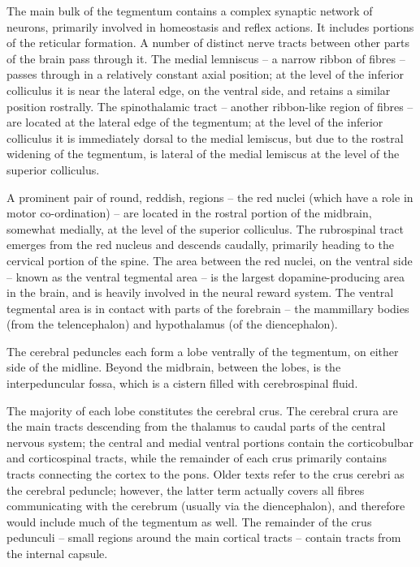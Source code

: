 The main bulk of the tegmentum contains a complex synaptic network of neurons, primarily involved in homeostasis and reflex actions. It includes portions of the reticular formation. A number of distinct nerve tracts between other parts of the brain pass through it. The medial lemniscus -- a narrow ribbon of fibres -- passes through in a relatively constant axial position; at the level of the inferior colliculus it is near the lateral edge, on the ventral side, and retains a similar position rostrally. The spinothalamic tract -- another ribbon-like region of fibres -- are located at the lateral edge of the tegmentum; at the level of the inferior colliculus it is immediately dorsal to the medial lemiscus, but due to the rostral widening of the tegmentum, is lateral of the medial lemiscus at the level of the superior colliculus.

A prominent pair of round, reddish, regions -- the red nuclei (which have a role in motor co-ordination) -- are located in the rostral portion of the midbrain, somewhat medially, at the level of the superior colliculus. The rubrospinal tract emerges from the red nucleus and descends caudally, primarily heading to the cervical portion of the spine. The area between the red nuclei, on the ventral side -- known as the ventral tegmental area -- is the largest dopamine-producing area in the brain, and is heavily involved in the neural reward system. The ventral tegmental area is in contact with parts of the forebrain -- the mammillary bodies (from the telencephalon) and hypothalamus (of the diencephalon).

The cerebral peduncles each form a lobe ventrally of the tegmentum, on either side of the midline. Beyond the midbrain, between the lobes, is the interpeduncular fossa, which is a cistern filled with cerebrospinal fluid.

The majority of each lobe constitutes the cerebral crus. The cerebral crura are the main tracts descending from the thalamus to caudal parts of the central nervous system; the central and medial ventral portions contain the corticobulbar and corticospinal tracts, while the remainder of each crus primarily contains tracts connecting the cortex to the pons. Older texts refer to the crus cerebri as the cerebral peduncle; however, the latter term actually covers all fibres communicating with the cerebrum (usually via the diencephalon), and therefore would include much of the tegmentum as well. The remainder of the crus pedunculi -- small regions around the main cortical tracts -- contain tracts from the internal capsule.

